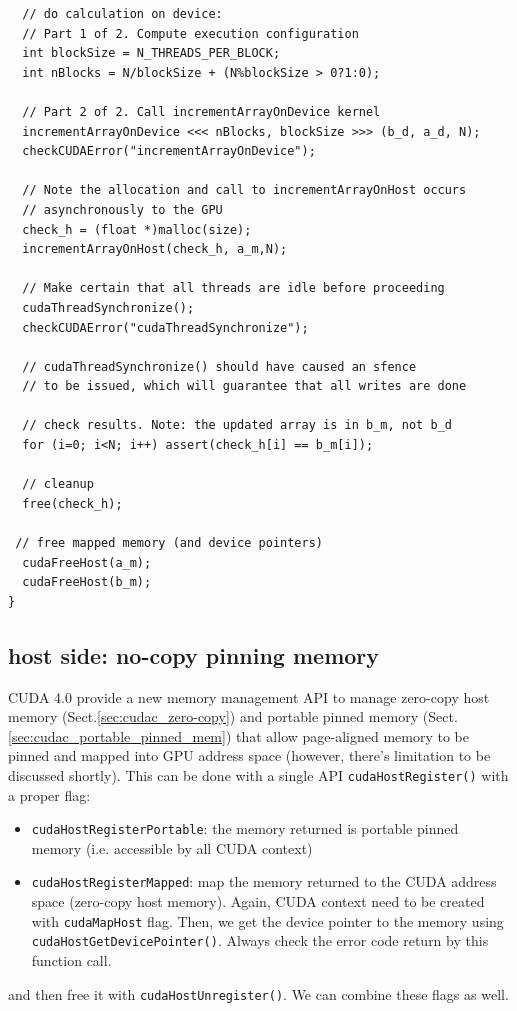 \begin{lstlisting}
  // do calculation on device:
  // Part 1 of 2. Compute execution configuration
  int blockSize = N_THREADS_PER_BLOCK;
  int nBlocks = N/blockSize + (N%blockSize > 0?1:0);

  // Part 2 of 2. Call incrementArrayOnDevice kernel 
  incrementArrayOnDevice <<< nBlocks, blockSize >>> (b_d, a_d, N);
  checkCUDAError("incrementArrayOnDevice");

  // Note the allocation and call to incrementArrayOnHost occurs 
  // asynchronously to the GPU
  check_h = (float *)malloc(size);
  incrementArrayOnHost(check_h, a_m,N);

  // Make certain that all threads are idle before proceeding
  cudaThreadSynchronize();
  checkCUDAError("cudaThreadSynchronize");

  // cudaThreadSynchronize() should have caused an sfence
  // to be issued, which will guarantee that all writes are done

  // check results. Note: the updated array is in b_m, not b_d
  for (i=0; i<N; i++) assert(check_h[i] == b_m[i]);

  // cleanup
  free(check_h);

 // free mapped memory (and device pointers)
  cudaFreeHost(a_m);
  cudaFreeHost(b_m);
}
\end{lstlisting}


\subsection{host side: no-copy pinning memory}
\label{sec:cuda4_nocopy_pinning}

CUDA 4.0 provide a new memory management API to manage zero-copy host memory
(Sect.\ref{sec:cudac_zero-copy}) and portable pinned memory
(Sect.\ref{sec:cudac_portable_pinned_mem}) that allow page-aligned memory to be
pinned and mapped into GPU address space (however, there's limitation to be
discussed shortly). This can be done with a single API \verb!cudaHostRegister()!
with a proper flag:
\begin{itemize}
  \item \verb!cudaHostRegisterPortable!: the memory returned is portable pinned
  memory (i.e. accessible by all CUDA context)
  \item \verb!cudaHostRegisterMapped!: map the memory returned to the CUDA
  address space (zero-copy host memory). Again, CUDA context need to be created
  with \verb!cudaMapHost! flag. Then, we get the device pointer to the memory
  using \verb!cudaHostGetDevicePointer()!. Always check the error code return by
  this function call.
\end{itemize}
and then free it with \verb!cudaHostUnregister()!. We can combine these flags as
well.

